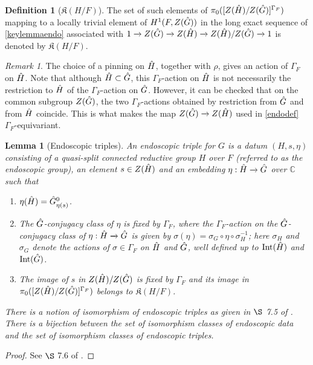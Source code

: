\documentclass[11pt,a4paper]{article}
\theoremstyle{definition}
\newtheorem{D}[shared]{Definition}
\theoremstyle{plain}
\newtheorem{Le}[shared]{Lemma}
\theoremstyle{remark}
\newtheorem{R}[shared]{Remark}
\theoremstyle{plain}
\DeclareMathOperator{\Int}{Int}
\begin{document}
\begin{D}[$\mathfrak{K}(H/F)$]
The set of such elements of $\pi_0([Z(\Hat{H})/Z(\Hat{G})]^{\Gamma_F})$ mapping to a locally trivial element of $H^1(F, Z(\Hat{G}))$ in the long exact sequence of \ref{keylemmaendo} associated with $1 \xrightarrow[]{} Z(\Hat{G}) \xrightarrow[]{} Z(\Hat{H}) \xrightarrow[]{} Z(\Hat{H}) / Z(\Hat{G}) \xrightarrow[]{} 1$ is denoted by $\mathfrak{K}(H/F)$.
\end{D}

\begin{R}
    The choice of a pinning on $\Hat{H}$, together with $\rho$, gives an action of $\Gamma_F$ on $\Hat{H}$. Note that although $\Hat{H} \subset \Hat{G}$, this $\Gamma_F$-action on $\Hat{H}$ is not necessarily the restriction to $\Hat{H}$ of the $\Gamma_F$-action on $\Hat{G}$. However, it can be checked that on the common subgroup $Z(\Hat{G})$, the two $\Gamma_F$-actions obtained by restriction from $\Hat{G}$ and from $\Hat{H}$ coincide. This is what makes the map $Z(\Hat{G}) \xrightarrow[]{} Z(\Hat{H})$ used in \ref{endodef} $\Gamma_F$-equivariant.
\end{R}

\begin{Le}[Endoscopic triples]\label{endotriples}
    An endoscopic triple for $G$ is a datum $(H,s,\eta)$ consisting of a quasi-split connected reductive group $H$ over $F$ (referred to as the endoscopic group), an element $s \in Z(\Hat{H})$ and an embedding $\eta: \Hat{H} \xrightarrow[]{} \Hat{G}$ over $\mathbb{C}$ such that
    \begin{enumerate}
        \item $\eta (\Hat{H}) = \Hat{G}^0_{\eta(s)}$.
        \item The $\Hat{G}$-conjugacy class of $\eta$ is fixed by $\Gamma_F$, where the $\Gamma_F$-action on the $\Hat{G}$-conjugacy class of $\eta: \Hat{H} \xrightarrow[]{} \Hat{G}$ is given by $\sigma(\eta) = \sigma_G\circ \eta \circ \sigma_H^{-1}$; here $\sigma_H$ and $\sigma_G$ denote the actions of $\sigma \in \Gamma_F$ on $\Hat{H}$ and $\Hat{G}$, well defined up to $\Int(\Hat{H})$ and $\Int(\Hat{G})$.
        \item The image of $s$ in $Z(\Hat{H})/Z(\Hat{G})$ is fixed by $\Gamma_F$ and its image in $\pi_0([Z(\Hat{H})/Z(\Hat{G})]^{\Gamma_F})$ belongs to $\mathfrak{K}(H/F)$.
    \end{enumerate}
    There is a notion of isomorphism of endoscopic triples as given in $\S$ 7.5 of \cite{MR0757954}. There is a bijection between the set of isomorphism classes of endoscopic data and the set of isomorphism classes of endoscopic triples.
\end{Le}
\begin{proof}
    See $\S$ 7.6 of \cite{MR0757954}.
\end{proof}
\end{document}
